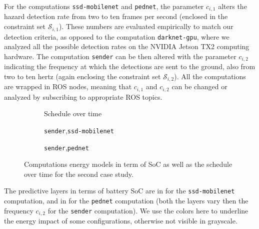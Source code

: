 For the computations {\small\tt ssd-mobilenet} and {\small\tt pednet}, the parameter $c_{i,1}$ alters the hazard detection rate from two to ten frames per second (enclosed in the constraint set $\mathcal{S}_{i,1}$). These numbers are evaluated empirically to match our detection criteria, as opposed to the computation {\small\tt darknet-gpu}, where we analyzed all the possible detection rates on the NVIDIA Jetson TX2 computing hardware. The computation {\small\tt sender} can be then altered with the parameter $c_{i,2}$ indicating the frequency at which the detections are sent to the ground, also from two to ten hertz (again enclosing the constraint set $\mathcal{S}_{i,2}$). All the computations are wrapped in ROS nodes, meaning that $c_{i,1}$ and $c_{i,2}$ can be changed or analyzed by subscribing to appropriate ROS topics.
\begin{figure}[h!]
  \centering
  \selectfont
  \footnotesize    
  \begin{subfigure}[b]{0.33\textwidth}
    \centering
    
    \caption{Schedule over time}
    \label{fig:max-qos}
  \end{subfigure}
  \begin{subfigure}[b]{0.32\textwidth}
    \centering
    
    \caption{{\tt\small sender},{\tt\small ssd-mobilenet}}
    \label{fig:pednet}
  \end{subfigure}
  \begin{subfigure}[b]{0.32\textwidth}
    \centering
    
    \caption{{\tt\small sender},{\tt\small pednet}}
    \label{fig:mobilenet}
  \end{subfigure}
  \caption[Computations energy models in term of SoC as well as the schedule over time]{Computations energy models in term of SoC as well as the schedule over time for the second case study.}
  \label{fig:computational}
\end{figure}
The predictive layers in terms of battery SoC are in  for the {\small\tt ssd-mobilenet} computation, and in  for the {\small\tt pednet} computation (both the layers vary then the frequency $c_{i,2}$ for the {\small\tt sender} computation). We use the colors here to underline the energy impact of some configurations, otherwise not visible in grayscale.

